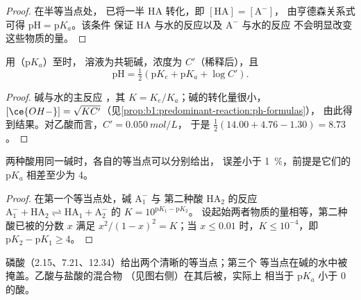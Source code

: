 \begin{proof}
在半等当点处， 
已将一半 HA 转化，即 $[\mathrm{HA}] = [\mathrm{A^-}]$，
由亨德森关系式可得 $\mathrm{pH} = \mathrm{p}K_a$。该条件
保证 HA 与水的反应以及 $\mathrm{A^-}$ 与水的反应
不会明显改变这些物质的量。
\end{proof}

\begin{proposition}[弱酸化学计量点处的 pH]\label{prop:b1:titration-methods:ph-at-equivalence}
用（$\mathrm{p}K_a$）至时，
溶液为共轭碱，浓度为 $C'$（稀释后），且
\[
  \mathrm{pH} = \tfrac12(\mathrm{p}K_e + \mathrm{p}K_a + \log C') .
\]
\end{proposition}

\begin{proof}
碱与水的主反应
，其 $K = K_e/K_a$；碱的转化量很小，
$[\ce{OH-}] = \sqrt{KC'}$（见\cref{prop:b1:predominant-reaction:ph-formulas}），
由此得到结果。对乙酸而言，$C' = \qty{0.050}{mol/L}$，
于是 $\frac12(14.00 + 4.76 - 1.30) = 8.73$。
\end{proof}

\begin{proposition}[连续滴定]\label{prop:b1:titration-methods:successive}
两种酸用同一碱时，各自的等当点可以分别给出，
误差小于 \qty{1}{\percent}，前提是它们的 $\mathrm{p}K_a$ 相差至少为 4。
\end{proposition}

\begin{proof}
在第一个等当点处，碱 $\mathrm{A_1^-}$ 与
第二种酸 $\mathrm{HA_2}$ 的反应 $\mathrm{A_1^-} + \mathrm{HA_2}
\rightleftharpoons \mathrm{HA_1} + \mathrm{A_2^-}$ 的 $K = 10^{\mathrm{p}K_1 - \mathrm{p}K_2}$。
设起始两者物质的量相等，第二种酸已被的分数 $x$
满足 $x^2/(1 - x)^2 = K$；当 $x \leqslant 0.01$ 时，$K
\leqslant 10^{-4}$，即 $\mathrm{p}K_2 - \mathrm{p}K_1 \geqslant 4$。
\end{proof}

磷酸（2.15、7.21、12.34）给出两个清晰的等当点；第三个
等当点在碱的水中被掩盖。乙酸与盐酸的混合物
（见图右侧）在其后被，实际上
相当于 $\mathrm{p}K_a$ 小于 0 的酸。

